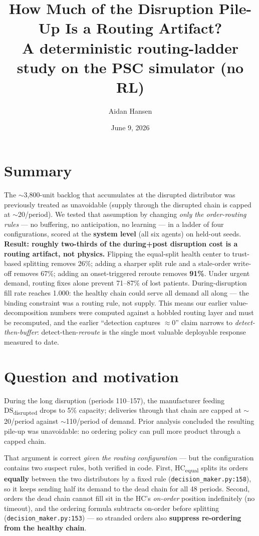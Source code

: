 \documentclass[11pt]{article}
\title{\textbf{How Much of the Disruption Pile-Up Is a Routing Artifact?}\\
\large A deterministic routing-ladder study on the PSC simulator (no RL)}
\author{Aidan Hansen}
\date{June 9, 2026}
\newcommand{\dsd}{DS\textsubscript{disrupted}}
\newcommand{\hce}{HC\textsubscript{equal}}
\begin{document}
\maketitle

\section*{Summary}
The $\sim$3{,}800-unit backlog that accumulates at the disrupted distributor was previously
treated as unavoidable (supply through the disrupted chain is capped at $\sim$20/period).
We tested that assumption by changing \emph{only the order-routing rules} --- no buffering, no
anticipation, no learning --- in a ladder of four configurations, scored at the
\textbf{system level} (all six agents) on held-out seeds.
\textbf{Result: roughly two-thirds of the during+post disruption cost is a routing artifact,
not physics.} Flipping the equal-split health center to trust-based splitting removes 26\%;
adding a sharper split rule and a stale-order write-off removes 67\%; adding an
onset-triggered reroute removes \textbf{91\%}. Under urgent demand, routing fixes alone
prevent 71--87\% of lost patients. During-disruption fill rate reaches 1.000: the healthy
chain could serve all demand all along --- the binding constraint was a routing rule, not
supply. This means our earlier value-decomposition numbers were computed against a hobbled
routing layer and must be recomputed, and the earlier ``detection captures $\approx$0'' claim
narrows to \emph{detect-then-buffer}: detect-then-\emph{reroute} is the single most valuable
deployable response measured to date.

\section{Question and motivation}

During the long disruption (periods 110--157), the manufacturer feeding \dsd{} drops to 5\%
capacity; deliveries through that chain are capped at $\sim$20/period against
$\sim$110/period of demand. Prior analysis concluded the resulting pile-up was unavoidable:
no ordering policy can pull more product through a capped chain.

That argument is correct \emph{given the routing configuration} --- but the configuration
contains two suspect rules, both verified in code. First, \hce{} splits its orders
\textbf{equally} between the two distributors by a fixed rule
(\texttt{decision\_maker.py:158}), so it keeps sending half its demand to the dead chain for
all 48 periods. Second, orders the dead chain cannot fill sit in the HC's \emph{on-order}
position indefinitely (no timeout), and the ordering formula subtracts on-order before
splitting (\texttt{decision\_maker.py:153}) --- so stranded orders also \textbf{suppress
re-ordering from the healthy chain}.
\end{document}

